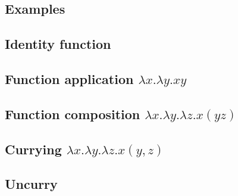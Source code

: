 \documentclass{article}
\theoremstyle{definition}
\begin{document}



\tableofcontents
















\newpage
\begin{appendices}
		
    \begin{landscape}
    	\section{Examples}
        \subsection{Identity function}  \label{ex1}
        \subsection{Function application \texorpdfstring{$\lambda x . \lambda y . x y$}{}}  \label{ex2}
        \newpage \subsection{Function composition \texorpdfstring{$\lambda x . \lambda y . \lambda z . x ( y z)$}{}}  \label{ex7}        
        \newpage \subsection{Currying \texorpdfstring{$\lambda x . \lambda y . \lambda z . x (y, z)$}{}}  \label{ex8}
        \newpage \subsection{Uncurry}  \label{ex9}
    \end{landscape}
\end{appendices}


 

\end{document}
